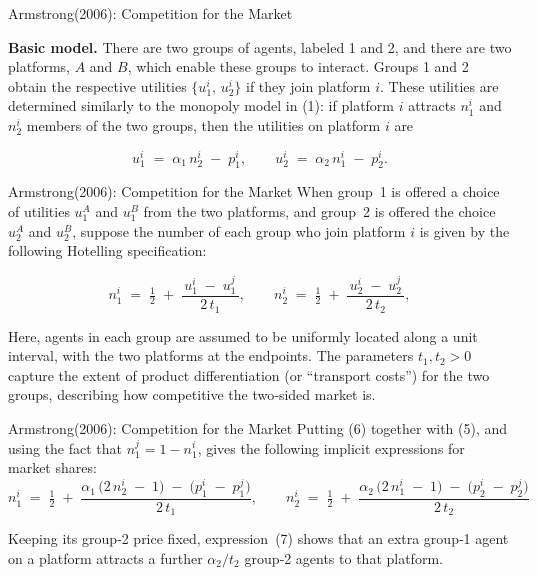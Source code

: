 \documentclass[aspectratio=169]{beamer}  %
\begin{document}
\begin{frame}{Armstrong(2006): Competition for the Market}

    \textbf{Basic model.} There are two groups of agents, labeled 1 and 2, and there are two platforms, \(A\) and \(B\), 
    which enable these groups to interact. Groups 1 and 2 obtain the respective utilities 
    \(\bigl\{u_1^i,\,u_2^i\bigr\}\) if they join platform \(i\). These utilities are determined 
    similarly to the monopoly model in (1): if platform \(i\) attracts \(n_1^i\) and \(n_2^i\) 
    members of the two groups, then the utilities on platform \(i\) are
    
    \[
       u_1^i \;=\;\alpha_1\,n_2^i \;-\; p_1^i,
       \qquad
       u_2^i \;=\;\alpha_2\,n_1^i \;-\; p_2^i.
       \tag{5}
    \]
\end{frame}
\begin{frame}{Armstrong(2006): Competition for the Market}
    When group~1 is offered a choice of utilities \(u_{1}^{A}\) and \(u_{1}^{B}\) from the two 
    platforms, and group~2 is offered the choice \(u_{2}^{A}\) and \(u_{2}^{B}\), suppose the 
    number of each group who join platform \(i\) is given by the following Hotelling specification:
    
    \[
       n_{1}^{i} 
       \;=\; 
       \tfrac{1}{2} 
       \;+\; 
       \frac{\,u_{1}^{i} \;-\; u_{1}^{j}\,}{2\,t_{1}},
       \qquad
       n_{2}^{i} 
       \;=\; 
       \tfrac{1}{2} 
       \;+\; 
       \frac{\,u_{2}^{i} \;-\; u_{2}^{j}\,}{2\,t_{2}},
       \tag{6}
    \]
    
    Here, agents in each group are assumed to be uniformly located along a unit interval, with the 
    two platforms at the endpoints. The parameters \(t_{1}, t_{2} > 0\) capture the extent of product 
    differentiation (or “transport costs”) for the two groups, describing how competitive the 
    two‐sided market is.
\end{frame}


\begin{frame}{Armstrong(2006): Competition for the Market}
    Putting (6) together with (5), and using the fact that \(n_{1}^{j} = 1 - n_{1}^{i}\),
    gives the following implicit expressions for market shares:
    \[
      n_{1}^{i} 
      \;=\; 
      \tfrac{1}{2}
      \;+\; 
      \frac{\alpha_{1}\,\bigl(2\,n_{2}^{i}\;-\;1\bigr)\;-\;\bigl(p_{1}^{i}\;-\;p_{1}^{j}\bigr)}
           {2\,t_{1}},
      \qquad
      n_{2}^{i} 
      \;=\; 
      \tfrac{1}{2}
      \;+\; 
      \frac{\alpha_{2}\,\bigl(2\,n_{1}^{i}\;-\;1\bigr)\;-\;\bigl(p_{2}^{i}\;-\;p_{2}^{j}\bigr)}
           {2\,t_{2}}
    \]
    
    Keeping its group‐2 price fixed, expression~(7) shows that an extra group‐1 agent on a platform 
    attracts a further \(\alpha_{2}/t_{2}\) group‐2 agents to that platform.
    
\end{frame}
\end{document}
